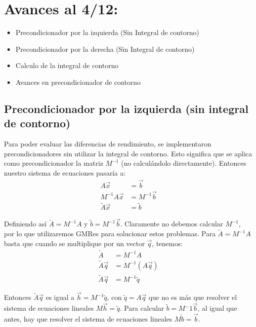 \documentclass[fleqn]{article}
\begin{document}
\newpage
\section{Avances al 4/12:}

\begin{itemize}
\item Precondicionador por la izquierda (Sin Integral de contorno)
\item Precondicionador por la derecha (Sin Integral de contorno) 
\item Calculo de la integral de contorno 
\item Avances en precondicionador de contorno
\end{itemize}

\subsection{Precondicionador por la izquierda (sin integral de contorno)}
Para poder evaluar las diferencias de rendimiento, se implementaron precondicionadores sin utilizar la integral de contorno. Esto significa que se aplica como precondicionador la matriz $M^{-1}$ (no calculándolo directamente). Entonces nuestro sistema de ecuaciones pasaría a:
\begin{align*}
    A\vec{x} &= \vec{b} \\
    M^{-1}A\vec{x} &= M^{-1}\vec{b} \\
    \widetilde{A}\vec{x} &= \widetilde{b}
\end{align*}

Definiendo así $\widetilde{A} = M^{-1}A$ y $\widetilde{b} = M^{-1}\vec{b}$. Claramente no debemos calcular $M^{-1}$, por lo que utilizaremos GMRes para solucionar estos problemas. Para $\widetilde{A} = M^{-1}A$ basta que cuando se multiplique por un vector $\vec{q}$, tenemos:
\begin{align*}
    \widetilde{A} &= M^{-1}A \\
    \widetilde{A}\vec{q} &= M^{-1}(A\vec{q}) \\
    \widetilde{A}\vec{q} &= M^{-1}\widetilde{q}
\end{align*}

Entonces $\widetilde{A}\vec{q}$ es igual a $\vec{h} = M^{-1}\widetilde{q}$, con $\widetilde{q} = A\vec{q}$ que no es más que resolver el sistema de ecuaciones lineales $M\vec{h} = \widetilde{q}$. Para calcular $\widetilde{b} = M{^-1}\vec{b}$, al igual que antes, hay que resolver el sistema de ecuaciones lineales $M\widetilde{b} = \vec{b}$.\newpage
\end{document}
